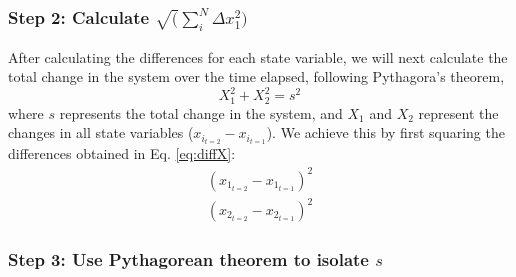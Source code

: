 \documentclass[12pt,twoside,openany]{reedthesis}
\begin{document}
\hypertarget{step-2-calculate-sqrtsum_indelta-x_12}{%
\subsubsection{\texorpdfstring{Step 2: Calculate \(\sqrt(\sum_i^N\Delta x_1^2)\)}{Step 2: Calculate \textbackslash sqrt(\textbackslash sum\_i\^{}N\textbackslash Delta x\_1\^{}2)}}\label{step-2-calculate-sqrtsum_indelta-x_12}}

After calculating the differences for each state variable, we will next calculate the total change in the system over the time elapsed, following Pythagora's theorem,
\begin{equation}
 X_1^2 + X_2^2 = s^2 
  \label{eq:pythagorean}
\end{equation}
where \(s\) represents the total change in the system, and \(X_1\) and \(X_2\) represent the changes in all state variables (\(x_{i_{t=2}} - x_{i_{t=1}}\)). We achieve this by first squaring the differences obtained in Eq. \eqref{eq:diffX}:
\begin{equation}
\begin{array}{rcr}
(x_{1_{t=2}} - x_{1_{t=1}})^2  \\
(x_{2_{t=2}} - x_{2_{t=1}})^2 
\end{array}
  \label{eq:diffXsq}
\end{equation}
\hypertarget{step-3-use-pythagorean-theorem-to-isolate-s}{%
\subsubsection{\texorpdfstring{Step 3: Use Pythagorean theorem to isolate \(s\)}{Step 3: Use Pythagorean theorem to isolate s}}\label{step-3-use-pythagorean-theorem-to-isolate-s}}
\end{document}
